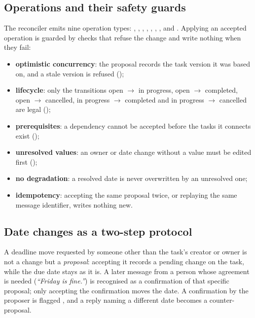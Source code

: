 \subsection{Operations and their safety guards}
The reconciler emits nine operation types: , , , , , , ,  and . Applying an accepted operation is guarded by checks that refuse the change and write nothing when they fail:
\begin{itemize}
  \item \textbf{optimistic concurrency}: the proposal records the task version it was based on, and a stale version is refused ();
  \item \textbf{lifecycle}: only the transitions open $\to$ in progress, open $\to$ completed, open $\to$ cancelled, in progress $\to$ completed and in progress $\to$ cancelled are legal ();
  \item \textbf{prerequisites}: a dependency cannot be accepted before the tasks it connects exist ();
  \item \textbf{unresolved values}: an owner or date change without a value must be edited first ();
  \item \textbf{no degradation}: a resolved date is never overwritten by an unresolved one;
  \item \textbf{idempotency}: accepting the same proposal twice, or replaying the same message identifier, writes nothing new.
\end{itemize}

\subsection{Date changes as a two-step protocol}
A deadline move requested by someone other than the task's creator or owner is not a change but a \emph{proposal}: accepting it records a pending change on the task, while the due date stays as it is. A later message from a person whose agreement is needed (\emph{``Friday is fine.''}) is recognised as a confirmation of that specific proposal; only accepting the confirmation moves the date. A confirmation by the proposer is flagged , and a reply naming a different date becomes a counter-proposal.

